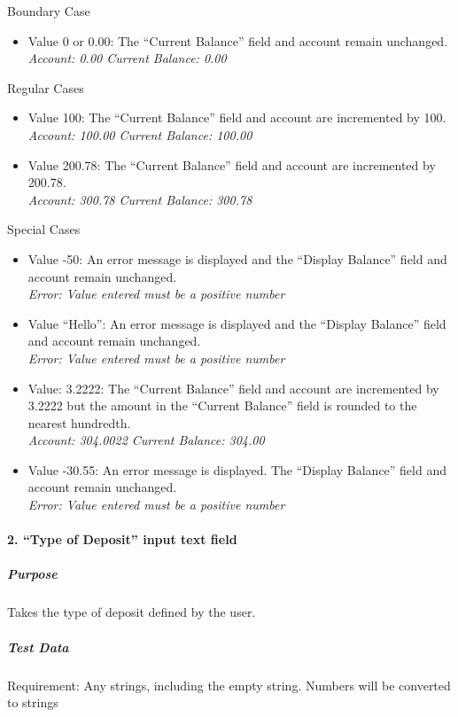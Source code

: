 \documentclass[12pt]{article}
\begin{document}
Boundary Case
\begin{itemize}
  \item Value 0 or 0.00: The “Current Balance” field and account remain unchanged.\\
{\it Account: 0.00 Current Balance: 0.00}
\end{itemize}

Regular Cases
\begin{itemize}
  \item Value 100: The “Current Balance” field and account are incremented by 100. 
{\it Account: 100.00 Current Balance: 100.00}
  \item Value 200.78: The “Current Balance” field and account are incremented by 200.78.\\
{\it Account: 300.78 Current Balance: 300.78}
\end{itemize}

Special Cases
\begin{itemize}
  \item Value -50: An error message is displayed and the “Display Balance” field and account remain unchanged.\\
{\it Error: Value entered must be a positive number}
  \item Value “Hello”: An error message is displayed and the “Display Balance” field and account remain unchanged.\\
{\it Error: Value entered must be a positive number}
  \item Value: 3.2222: The “Current Balance” field and account are incremented by 3.2222 but the amount in the “Current Balance” field is rounded to the nearest hundredth.\\
{\it Account: 304.0022 Current Balance: 304.00}
  \item Value -30.55: An error message is displayed. The “Display Balance” field and account remain unchanged.\\
{\it Error: Value entered must be a positive number}
\end{itemize}

\paragraph{2. “Type of Deposit” input text field}
\subparagraph{Purpose} Takes the type of deposit defined by the user.

\subparagraph{Test Data} Requirement: Any strings, including the empty string. Numbers will be converted to strings
\end{document}
